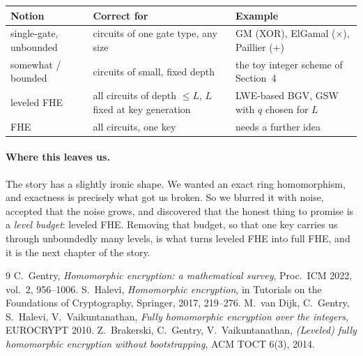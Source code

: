 \documentclass[11pt,a4paper]{article}
\begin{document}
\begin{center}\small
\begin{tabularx}{\textwidth}{@{}l X X@{}}
\toprule
\textbf{Notion} & \textbf{Correct for} & \textbf{Example} \\
\midrule
single-gate, unbounded & circuits of one gate type, any size & GM (XOR), ElGamal ($\times$), Paillier ($+$) \\
somewhat / bounded & circuits of small, fixed depth & the toy integer scheme of Section~4 \\
leveled FHE & all circuits of depth $\le L$, $L$ fixed at key generation & LWE-based BGV, GSW with $q$ chosen for $L$ \\
FHE & all circuits, one key & needs a further idea \\
\bottomrule
\end{tabularx}
\end{center}

\paragraph{Where this leaves us.} The story has a slightly ironic shape. We
wanted an exact ring homomorphism, and exactness is precisely what got us
broken. So we blurred it with noise, accepted that the noise grows, and
discovered that the honest thing to promise is a \emph{level budget}: leveled
FHE. Removing that budget, so that one key carries us through unboundedly many
levels, is what turns leveled FHE into full FHE, and it is the next chapter of
the story.

\begin{thebibliography}{9}\small
{} C.~Gentry, \emph{Homomorphic encryption: a mathematical
  survey}, Proc.\ ICM 2022, vol.~2, 956--1006.
 S.~Halevi, \emph{Homomorphic encryption}, in Tutorials on
  the Foundations of Cryptography, Springer, 2017, 219--276.
 M.~van Dijk, C.~Gentry, S.~Halevi, V.~Vaikuntanathan,
  \emph{Fully homomorphic encryption over the integers}, EUROCRYPT 2010.
 Z.~Brakerski, C.~Gentry, V.~Vaikuntanathan, \emph{(Leveled)
  fully homomorphic encryption without bootstrapping}, ACM TOCT 6(3), 2014.
\end{thebibliography}
\end{document}
